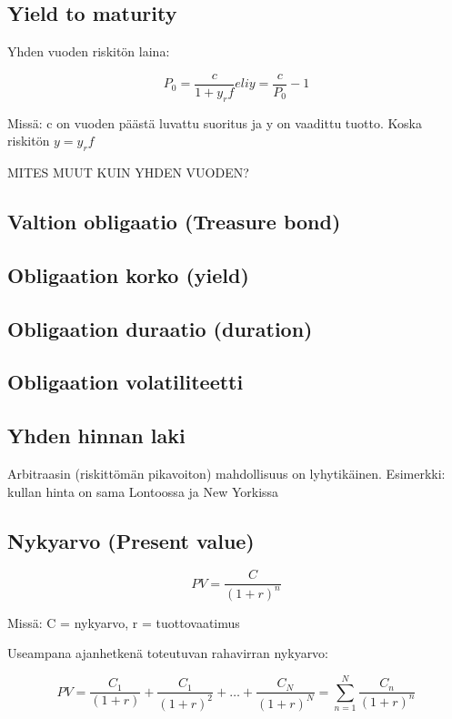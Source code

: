 \documentclass[a4paper]{article}
\begin{document}
\subsection{Yield to maturity}

Yhden vuoden riskitön laina:

\[
P_0 = \frac{c}{1 + y_rf} eli y = \frac{c}{P_0} - 1
\]

Missä: c on vuoden päästä luvattu suoritus ja y on vaadittu tuotto. Koska riskitön $y = y_rf$

MITES MUUT KUIN YHDEN VUODEN?

\subsection{Valtion obligaatio (Treasure bond)}

\subsection{Obligaation korko (yield)}

\subsection{Obligaation duraatio (duration)}

\subsection{Obligaation volatiliteetti}


\subsection{Yhden hinnan laki}

Arbitraasin (riskittömän pikavoiton) mahdollisuus on lyhytikäinen.
Esimerkki: kullan hinta on sama Lontoossa ja New Yorkissa

\subsection{Nykyarvo (Present value)}

\[
PV = \frac{C}{(1 + r)^n}
\]

Missä: C = nykyarvo, r = tuottovaatimus

Useampana ajanhetkenä toteutuvan rahavirran nykyarvo:

\[
PV = \frac{C_1}{(1 + r)} + \frac{C_1}{(1 + r)^2} + \dots + \frac{C_N}{(1 + r)^N} = \sum_{n=1}^{N} \frac{C_n}{(1 + r)^n}
\]
\end{document}
